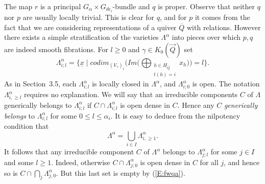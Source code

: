 \documentclass[a4paper,10pt]{amsart}
\def\vecdq{\overline{Q}}
\def\a{\alpha}
\numberwithin{equation}{section}
\begin{document}
The map $r$ is a principal $G_{\a} \times G_{d\epsilon_i}$-bundle and $q$ is proper. Observe that neither $q$ nor $p$ are usually locally trivial. This is clear for $q$, and for $p$ it comes from the fact that we are considering representations of a quiver $\vecdq$ with relations. However there exists a simple stratification of the varieties $\Lambda^{\a}$ into pieces over which $p, q$ are indeed smooth fibrations. For $l \geq 0$ and $\gamma \in K_0(\vec{Q})$ set
$$\Lambda^{\a}_{i;l}=\bigg\{ \underline{x}\;|\; codim_{(V_{\gamma})_i} \bigg( Im\big( \bigoplus_{\substack{h \in H_{\vecdq}\\ t(h)=i}} x_h \big)\bigg)=l\bigg\}.$$
As in Section~3.5, each $\Lambda^{\a}_{i;l}$ is locally closed in $\Lambda^{\a}$, and $\Lambda^{\a}_{i;0}$ is open.  The notation $\Lambda^{\a}_{i,\geq l}$ requires no explanation. We will say that an irreducible components $C$ of $\Lambda$ generically belongs to $\Lambda^{\a}_{i;l}$ if $C \cap \Lambda^{\a}_{i;l}$ is open dense in $C$. Hence any $C$ \textit{generically belongs} to $\Lambda^{\a}_{i;l}$ for some $0 \leq l \leq \a_i$. It is easy to deduce from the nilpotency condition that
\begin{equation}\label{E:fwqa}
\Lambda^{\a}=\bigcup_{i \in I} \Lambda^{\a}_{i, \geq 1}.
\end{equation}
It follows that any irreducible component $C$ of $\Lambda^{\a}$ belongs to $\Lambda^{\a}_{j;l}$ for some $j \in I$ and some $l \geq 1$. Indeed, otherwise $C \cap \Lambda^{\a}_{j;0}$ is open dense in $C$ for all $j$, and hence so is $C \cap \bigcap_j \Lambda^{\a}_{j,0}.$ But this last set is empty by (\ref{E:fwqa}).

\vspace{.1in}
\end{document}
